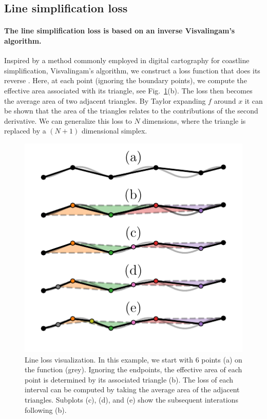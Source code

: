 \hypertarget{line-simplification-loss}{%
\subsection{Line simplification loss}\label{line-simplification-loss}}

\hypertarget{the-line-simplification-loss-is-based-on-an-inverse-visvalingams-algorithm.}{%
\paragraph{The line simplification loss is based on an inverse Visvalingam's algorithm.}\label{the-line-simplification-loss-is-based-on-an-inverse-visvalingams-algorithm.}}

Inspired by a method commonly employed in digital cartography for coastline simplification, Visvalingam's algorithm, we construct a loss function that does its reverse \cite{Visvalingam1990}.
Here, at each point (ignoring the boundary points), we compute the effective area associated with its triangle, see Fig.~\ref{fig:line_loss}(b).
The loss then becomes the average area of two adjacent triangles.
By Taylor expanding $f$ around $x$ it can be shown that the area of the triangles relates to the contributions of the second derivative.
We can generalize this loss to $N$ dimensions, where the triangle is replaced by a $(N+1)$ dimensional simplex.

\begin{figure}
\hypertarget{fig:line_loss}{%
\centering
\includegraphics{chapter_adaptive/figures/line_loss.pdf}
\caption{Line loss visualization.
In this example, we start with 6 points (a) on the function (grey).
Ignoring the endpoints, the effective area of each point is determined by its associated triangle (b).
The loss of each interval can be computed by taking the average area of the adjacent triangles.
Subplots (c), (d), and (e) show the subsequent interations following (b).}\label{fig:line_loss}
}
\end{figure}

